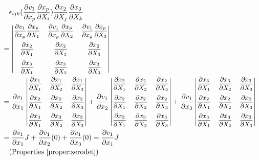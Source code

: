 \begin{align*}
&\quad\epsilon_{ijk} (\frac{\partial v_1}{\partial x_p}\frac{\partial x_p}{\partial X_i})\frac{\partial x_2}{\partial X_j}\frac{\partial x_3}{\partial X_k} \\
&= \small\begin{vmatrix}
\dfrac{\partial v_1}{\partial x_p}\dfrac{\partial x_p}{\partial X_1} & \dfrac{\partial v_1}{\partial x_p}\dfrac{\partial x_p}{\partial X_2} & \dfrac{\partial v_1}{\partial x_p}\dfrac{\partial x_p}{\partial X_3} \\[10pt]
\dfrac{\partial x_2}{\partial X_1} & \dfrac{\partial x_2}{\partial X_2} & \dfrac{\partial x_2}{\partial X_3} \\[10pt]
\dfrac{\partial x_3}{\partial X_1} & \dfrac{\partial x_3}{\partial X_2} & \dfrac{\partial x_3}{\partial X_3} 
\end{vmatrix} \\
&= \frac{\partial v_1}{\partial x_1}\small\begin{vmatrix}
\dfrac{\partial x_1}{\partial X_1} & \dfrac{\partial x_1}{\partial X_2} & \dfrac{\partial x_1}{\partial X_3} \\[10pt]
\dfrac{\partial x_2}{\partial X_1} & \dfrac{\partial x_2}{\partial X_2} & \dfrac{\partial x_2}{\partial X_3} \\[10pt]
\dfrac{\partial x_3}{\partial X_1} & \dfrac{\partial x_3}{\partial X_2} & \dfrac{\partial x_3}{\partial X_3} 
\end{vmatrix} +
\frac{\partial v_1}{\partial x_2}\small\begin{vmatrix}
\dfrac{\partial x_2}{\partial X_1} & \dfrac{\partial x_2}{\partial X_2} & \dfrac{\partial x_2}{\partial X_3} \\[10pt]
\dfrac{\partial x_2}{\partial X_1} & \dfrac{\partial x_2}{\partial X_2} & \dfrac{\partial x_2}{\partial X_3} \\[10pt]
\dfrac{\partial x_3}{\partial X_1} & \dfrac{\partial x_3}{\partial X_2} & \dfrac{\partial x_3}{\partial X_3} 
\end{vmatrix} +
\frac{\partial v_1}{\partial x_3}\small\begin{vmatrix}
\dfrac{\partial x_3}{\partial X_1} & \dfrac{\partial x_3}{\partial X_2} & \dfrac{\partial x_3}{\partial X_3} \\[10pt]
\dfrac{\partial x_2}{\partial X_1} & \dfrac{\partial x_2}{\partial X_2} & \dfrac{\partial x_2}{\partial X_3} \\[10pt]
\dfrac{\partial x_3}{\partial X_1} & \dfrac{\partial x_3}{\partial X_2} & \dfrac{\partial x_3}{\partial X_3} 
\end{vmatrix} \\
&= \frac{\partial v_1}{\partial x_1} J + \frac{\partial v_1}{\partial x_2}(0) + \frac{\partial v_1}{\partial x_3} (0) = \frac{\partial v_1}{\partial x_1} J \\
&\quad \text{(Properties \ref{proper:zerodet})}
\end{align*}
